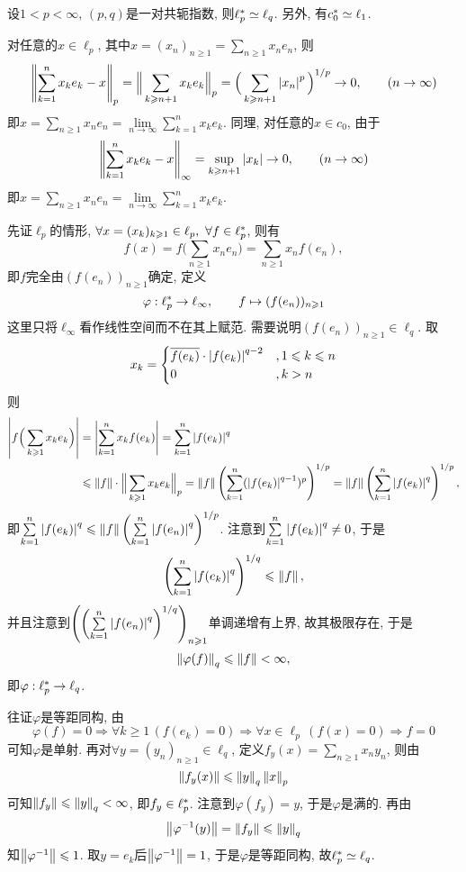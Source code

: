 	\begin{Proposition}
		设$ 1<p<\infty $, $ (p,q) $是一对共轭指数, 则$ \ell_p^{*}\simeq\ell_q $. 另外, 有$ c_0^{*}\simeq\ell_1 $.
	\end{Proposition}
	\begin{Proof}
		对任意的$ x\in\ell_p $, 其中$ x=(x_n)_{n\geqslant 1}=\sum\limits_{n\geqslant 1}x_ne_n $, 则
		\[
		\left\| \sum_{k=1}^nx_ke_k-x \right\|_p=\Big\| \sum_{k\geqslant n+1}x_ke_k \Big\|_p=\Big(\sum_{k\geqslant n+1}\left| x_n \right| ^p\Big)^{1/p}\to 0,\qquad(n\to\infty)
		\]
		即$ x=\sum\limits_{n\geqslant 1}x_ne_n=\lim\limits_{n\to\infty}\sum\limits_{k=1}^nx_ke_k $. 同理, 对任意的$ x\in c_0 $, 由于
		\[
		\left\| \sum_{k=1}^nx_ke_k-x \right\|_\infty=\sup_{k\geqslant n+1}\left| x_k \right| \to 0,\qquad(n\to\infty)
		\]
		即$ x=\sum\limits_{n\geqslant 1}x_ne_n=\lim\limits_{n\to\infty}\sum\limits_{k=1}^nx_ke_k $.
		
		先证$ \ell_p $的情形, $ \forall x=(x_k)_{k\geqslant 1}\in\ell_p,\ \forall f\in\Star{\ell_p} $, 则有
		\[
		f(x)=f\Big( \sum_{n\geqslant 1}x_ne_n \Big)=\sum_{n\geqslant 1}x_nf(e_n),
		\]
		即$ f $完全由$ (f(e_n))_{n\geqslant 1} $确定, 定义
		\[
		\varphi : \ell_p^{*}\to\ell_\infty,\qquad f\mapsto(f(e_n))_{n\geqslant 1}
		\]
		这里只将$ \ell_\infty $看作线性空间而不在其上赋范. 需要说明$ (f(e_n))_{n\geqslant 1}\in\ell_q $. 取
		\[
		x_k=\begin{cases}
		\overline{f(e_k)}\cdot\left| f(e_k) \right| ^{q-2} & ,1\leqslant k\leqslant n\\
		0 & , k>n\\
		\end{cases}
		\]
		则
		\[
		\begin{aligned}
		\left| f\Big(\sum_{k\geqslant 1}x_ke_k\Big) \right| &=\left| \sum_{k=1}^nx_kf(e_k) \right| =\sum_{k=1}^n\left| f(e_k) \right| ^q\\
		&\leqslant\left\| f \right\|\cdot\Big\| \sum_{k\geqslant 1}x_ke_k \Big\|_p=\left\| f \right\|\left(\sum_{k=1}^n(\left| f(e_k) \right| ^{q-1})^p\right)^{1/p}=\left\| f \right\|\left(\sum_{k=1}^n\left| f(e_k) \right| ^q\right)^{1/p},
		\end{aligned}
		\]
		即$ \sum\limits_{k=1}^n\left| f(e_k) \right| ^q\leqslant\left\| f \right\|\left(\sum\limits_{k=1}^n\left| f(e_n) \right| ^q\right)^{1/p} $. 注意到$ \sum\limits_{k=1}^n\left| f(e_k) \right| ^q\ne 0 $, 于是
		\[
		\left(\sum_{k=1}^n\left| f(e_k) \right| ^q\right)^{1/q}\leqslant\left\| f \right\|,
		\]
		并且注意到$ \left(\left(\sum\limits_{k=1}^n\left| f(e_n) \right| ^q\right)^{1/q}\right)_{n\geqslant 1} $单调递增有上界, 故其极限存在, 于是
		\[
		\left\| \varphi(f) \right\|_q\leqslant\left\| f \right\|<\infty,
		\]
		即$ \varphi : \ell_p^{*}\to\ell_q $.
		
		往证$ \varphi $是等距同构, 由
		\[
		\varphi(f)=0\Longrightarrow\forall k\geqslant 1\,(f(e_k)=0)\Longrightarrow\forall x\in\ell_p\,(f(x)=0)\Longrightarrow f=0
		\]
		可知$ \varphi $是单射. 再对$ \forall y=(y_n)_{n\geqslant 1}\in\ell_q $, 定义$ f_y(x)=\sum\limits_{n\geqslant 1}x_ny_n $, 则由
		\[
		\left\| f_y(x) \right\|\leqslant\left\| y \right\|_q\left\| x \right\|_p
		\]
		可知$ \left\| f_y \right\|\leqslant\left\| y \right\|_q<\infty $, 即$ f_y\in\ell_p^{*} $. 注意到$ \varphi(f_y)=y $, 于是$ \varphi $是满的. 再由
		\[
		\left\| \varphi^{-1}(y) \right\|=\left\| f_y \right\|\leqslant\left\| y \right\|_q
		\]
		知$ \left\| \varphi^{-1} \right\|\leqslant 1 $. 取$ y=e_k $后$ \left\| \varphi^{-1} \right\|=1 $, 于是$ \varphi $是等距同构, 故$ \ell_p^{*}\simeq\ell_q $.
		

\end{Proof}
